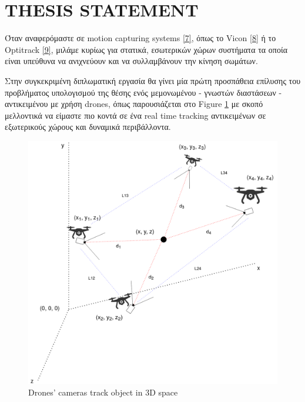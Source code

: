 \section{THESIS STATEMENT}
Όταν αναφερόμαστε σε motion capturing systems \hyperref[bib:7]{[7]}, όπως το Vicon \hyperref[bib:8]{[8]} 
ή το Optitrack \hyperref[bib:9]{[9]}, μιλάμε κυρίως για στατικά, εσωτερικών χώρων συστήματα 
τα οποία είναι υπεύθυνα να ανιχνεύουν και να συλλαμβάνουν την κίνηση σωμάτων.

Στην συγκεκριμένη διπλωματική εργασία θα γίνει μία πρώτη προ\-σπά\-θεια επίλυσης του 
προβλήματος υπο\-λο\-γι\-σμού της θέσης ενός μεμονωμένου - γνωστών διαστάσεων - αντικειμένου 
με χρήση drones, όπως παρουσιάζεται στο Figure \ref{fig:1} με σκοπό μελλοντικά να είμαστε 
πιο κοντά σε ένα real time tra\-cking αντικειμένων σε εξωτερικούς χώρους και δυναμικά περιβάλλοντα.

\begin{figure}[thpb]
  \centering
  \includegraphics[width=\linewidth]{Images/3dDrones-camera-pose.png}
  \caption{Drones' cameras track object in 3D space}
  \label{fig:1}
\end{figure}

